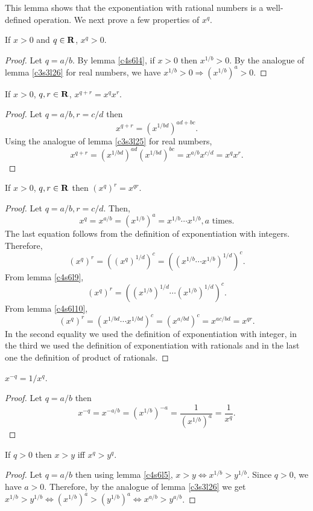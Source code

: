 This lemma shows that the exponentiation with rational numbers is a 
well-defined operation. We next prove a few properties of $x^q$.

\begin{lem}\label{c4s6l12}
If $x > 0$ and $q \in \mathbf{R}$, $x^q > 0$.
\end{lem}
\begin{proof}
Let $q = a/b$. By lemma \ref{c4s6l4}, if $x > 0$ then $x^{1/b} > 0$. By the
analogue of lemma \ref{c3s3l26} for real numbers, we have $x^{1/b} > 0
\Rightarrow (x^{1/b})^a > 0$.
\end{proof}

\begin{lem}\label{c4s6l13}
If $x > 0$, $q, r \in \mathbf{R}$, $x^{q+r} = x^q x^r$.
\end{lem}
\begin{proof}
Let $q = a/b, r = c/d$ then 
\[
x^{q+r} = (x^{1/bd})^{ad + bc}.
\]
Using the analogue of lemma \ref{c3s3l25} for real numbers,
\[
x^{q+r} = (x^{1/bd})^{ad} (x^{1/bd})^{bc} = x^{a/b} x^{c/d} = x^q x^r.
\]
\end{proof}

\begin{lem}\label{c4s6l14}
If $x > 0$, $q, r \in \mathbf{R}$ then $(x^q)^r = x^{qr}$.
\end{lem}
\begin{proof}
Let $q = a/b, r = c/d$. Then, 
\[
x^q = x^{a/b} = (x^{1/b})^a = x^{1/b} \cdots x^{1/b}, a \text{ times.}
\]
The last equation follows from the definition of exponentiation with 
integers. Therefore,
\[
(x^q)^r = ((x^q)^{1/d})^c = ((x^{1/b} \cdots x^{1/b})^{1/d})^c.
\]
From lemma \ref{c4s6l9},
\[
(x^q)^r = ((x^{1/b})^{1/d} \cdots (x^{1/b})^{1/d})^c.
\]
From lemma \ref{c4s6l10},
\[
(x^q)^r = (x^{1/bd} \cdots x^{1/bd})^c = (x^{a/bd})^c = x^{ac/bd} = x^{qr}.
\]
In the second equality we used the definition of exponentiation with 
integer, in the third we used the definition of exponentiation with 
rationals and in the last one the definition of product of rationals.
\end{proof}

\begin{lem}\label{c4s6l15}
$x^{-q} = 1/x^q$.
\end{lem}
\begin{proof}
Let $q = a/b$ then 
\[
x^{-q} = x^{-a/b} = (x^{1/b})^{-a} = \frac{1}{(x^{1/b})^a} = \frac{1}{x^q}.
\]
\end{proof}

\begin{lem}\label{c4s6l16}
If $q > 0$ then $x > y$ iff $x^q > y^q$.
\end{lem}
\begin{proof}
Let $q = a/b$ then using lemma \ref{c4s6l5}, $x > y \Leftrightarrow
x^{1/b} > y^{1/b}$. Since $q > 0$, we have $a > 0$. Therefore, by the 
analogue of lemma \ref{c3s3l26} we get $x^{1/b} > y^{1/b} \Leftrightarrow
(x^{1/b})^a > (y^{1/b})^a \Leftrightarrow x^{a/b} > y^{a/b}$.
\end{proof}

